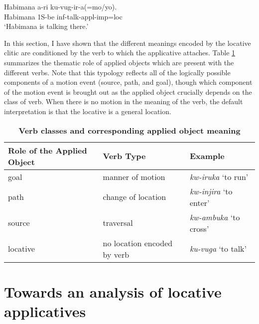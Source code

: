 \documentclass[output=paper]{langsci/langscibook}
\begin{document}
\begin{exe}
		\ex\label{sade}\gll Habimana a-ri ku-vug-ir-a(=mo/yo).\\
			Habimana 1S-{\sc be} {\sc inf}-talk-{\sc appl-imp=loc}\\
				\glt `Habimana is talking there.' 
	\end{exe}

In this section, I have shown that the different meanings encoded by the locative clitic are conditioned by the verb to which the applicative attaches. Table \ref{tab:verb} summarizes the thematic role of applied objects which are present with the different verbs. Note that this typology reflects all of the logically possible components of a motion event ({\sc source, path, and goal}), though which component of the motion event is brought out as the applied object crucially depends on the class of verb. When there is no motion in the meaning of the verb, the default interpretation is that the {\sc locative} is a general location. 
\begin{table}
\begin{center}\caption{\textbf{Verb classes and corresponding applied object meaning}}
\begin{tabular}[t]{lll}\\\hline
 Role of the Applied Object		& Verb Type		& Example \\\hline

{\sc goal}					& manner of motion 	& \emph{kw-iruka} `to run' \\

{\sc path} 					& change of location	& \emph{kw-injira} `to enter'\\

{\sc source}			 	& traversal			& \emph{kw-ambuka} `to cross' \\

{\sc  locative}		& no location encoded by verb & \emph{ku-vuga} `to talk' \\\hline

\end{tabular}
	 
\label{tab:verb} 
	 		 \end{center}
\end{table}





 


\section{Towards an analysis of locative applicatives}%
\end{document}
